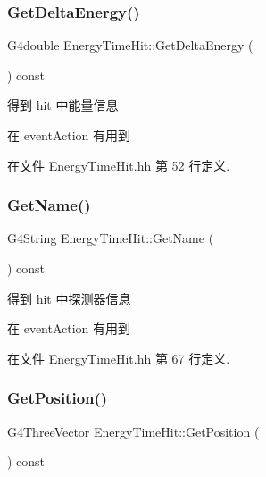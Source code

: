 \subsubsection{\texorpdfstring{Get\+Delta\+Energy()}{GetDeltaEnergy()}}
{\footnotesize\ttfamily G4double Energy\+Time\+Hit\+::\+Get\+Delta\+Energy (\begin{DoxyParamCaption}{ }\end{DoxyParamCaption}) const\hspace{0.3cm}{\ttfamily [inline]}}



得到 hit 中能量信息 

在 event\+Action 有用到 

在文件 Energy\+Time\+Hit.\+hh 第 52 行定义.

\mbox{\label{classEnergyTimeHit_a7e348ee943ce7065910e75b0063108d5}} 
\subsubsection{\texorpdfstring{Get\+Name()}{GetName()}}
{\footnotesize\ttfamily G4\+String Energy\+Time\+Hit\+::\+Get\+Name (\begin{DoxyParamCaption}{ }\end{DoxyParamCaption}) const\hspace{0.3cm}{\ttfamily [inline]}}



得到 hit 中探测器信息 

在 event\+Action 有用到 

在文件 Energy\+Time\+Hit.\+hh 第 67 行定义.

\mbox{\label{classEnergyTimeHit_a4611709e7caf2e34f4e368dd8c4e8ad4}} 
\subsubsection{\texorpdfstring{Get\+Position()}{GetPosition()}}
{\footnotesize\ttfamily G4\+Three\+Vector Energy\+Time\+Hit\+::\+Get\+Position (\begin{DoxyParamCaption}{ }\end{DoxyParamCaption}) const\hspace{0.3cm}{\ttfamily [inline]}}



